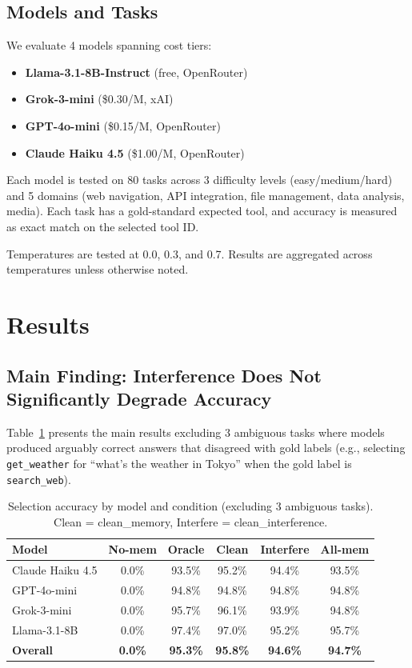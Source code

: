 \documentclass[11pt]{article}
\begin{document}
\subsection{Models and Tasks}

We evaluate 4 models spanning cost tiers:
\begin{itemize}
    \item \textbf{Llama-3.1-8B-Instruct} (free, OpenRouter)
    \item \textbf{Grok-3-mini} (\$0.30/M, xAI)
    \item \textbf{GPT-4o-mini} (\$0.15/M, OpenRouter)
    \item \textbf{Claude Haiku 4.5} (\$1.00/M, OpenRouter)
\end{itemize}

Each model is tested on 80 tasks across 3 difficulty levels (easy/medium/hard) and 5 domains (web navigation, API integration, file management, data analysis, media). Each task has a gold-standard expected tool, and accuracy is measured as exact match on the selected tool ID.

Temperatures are tested at 0.0, 0.3, and 0.7. Results are aggregated across temperatures unless otherwise noted.


\section{Results}

\subsection{Main Finding: Interference Does Not Significantly Degrade Accuracy}

Table~\ref{tab:main} presents the main results excluding 3 ambiguous tasks where models produced arguably correct answers that disagreed with gold labels (e.g., selecting \texttt{get\_weather} for ``what's the weather in Tokyo'' when the gold label is \texttt{search\_web}).

\begin{table}[t]
\centering
\small
\begin{tabular}{lccccc}
\toprule
\textbf{Model} & \textbf{No-mem} & \textbf{Oracle} & \textbf{Clean} & \textbf{Interfere} & \textbf{All-mem} \\
\midrule
Claude Haiku 4.5 & 0.0\% & 93.5\% & 95.2\% & 94.4\% & 93.5\% \\
GPT-4o-mini & 0.0\% & 94.8\% & 94.8\% & 94.8\% & 94.8\% \\
Grok-3-mini & 0.0\% & 95.7\% & 96.1\% & 93.9\% & 94.8\% \\
Llama-3.1-8B & 0.0\% & 97.4\% & 97.0\% & 95.2\% & 95.7\% \\
\midrule
\textbf{Overall} & \textbf{0.0\%} & \textbf{95.3\%} & \textbf{95.8\%} & \textbf{94.6\%} & \textbf{94.7\%} \\
\bottomrule
\end{tabular}
\caption{Selection accuracy by model and condition (excluding 3 ambiguous tasks). Clean = clean\_memory, Interfere = clean\_interference.}
\label{tab:main}
\end{table}
\end{document}
